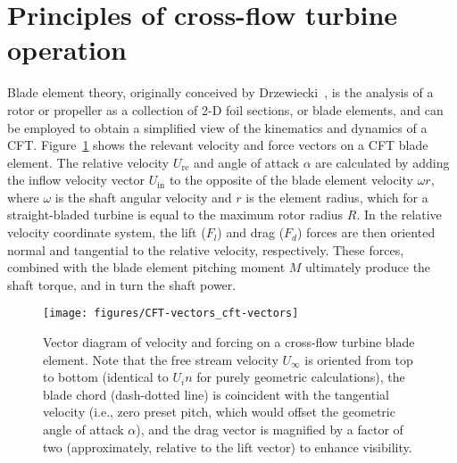 \section{Principles of cross-flow turbine operation}

Blade element theory, originally conceived by
Drzewiecki~\cite{Drzewiecki1892,Drzewiecki1920}, is the analysis of a rotor or
propeller as a collection of 2-D foil sections, or blade elements, and can be
employed to obtain a simplified view of the kinematics and dynamics of a CFT.
Figure~\ref{fig:vectors} shows the relevant velocity and force vectors on a CFT
blade element. The relative velocity $U_{\mathrm{re}}$ and angle of attack
$\alpha$ are calculated by adding the inflow velocity vector $U_{\mathrm{in}}$
to the opposite of the blade element velocity $\omega r$, where $\omega$ is the
shaft angular velocity and $r$ is the element radius, which for a
straight-bladed turbine is equal to the maximum rotor radius $R$. In the
relative velocity coordinate system, the lift ($F_l$) and drag ($F_d$) forces
are then oriented normal and tangential to the relative velocity, respectively.
These forces, combined with the blade element pitching moment $M$ ultimately
produce the shaft torque, and in turn the shaft power.

\begin{figure}
    \centering

    \texttt{[image: figures/CFT-vectors\_cft-vectors]}

    \caption{Vector diagram of velocity and forcing on a cross-flow turbine
        blade element. Note that the free stream velocity $U_\infty$ is oriented
        from top to bottom (identical to $U_in$ for purely geometric calculations),
        the blade chord (dash-dotted line) is coincident with the tangential
        velocity (i.e., zero preset pitch, which would offset the geometric angle of
        attack $\alpha$), and the drag vector is magnified by a factor of two
        (approximately, relative to the lift vector) to enhance visibility.}

    \label{fig:vectors}
\end{figure}

